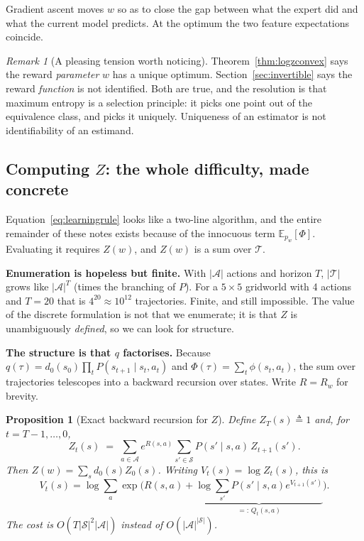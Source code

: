 \documentclass[11pt]{article}
\theoremstyle{plain}
\newtheorem{proposition}[theorem]{Proposition}
\theoremstyle{definition}
\theoremstyle{remark}
\newtheorem{remark}[theorem]{Remark}
\renewcommand{\S}{\mathcal{S}}
\newcommand{\A}{\mathcal{A}}
\newcommand{\T}{\mathcal{T}}
\newcommand{\E}{\mathbb{E}}
\begin{document}
Gradient ascent moves $w$ so as to close the gap between what the expert
did and what the current model predicts. At the optimum the two feature
expectations coincide.

\begin{remark}[A pleasing tension worth noticing]
Theorem~\ref{thm:logzconvex} says the reward \emph{parameter} $w$ has a
unique optimum. Section~\ref{sec:invertible} says the reward
\emph{function} is not identified. Both are true, and the resolution is
that maximum entropy is a selection principle: it picks one point out of
the equivalence class, and picks it uniquely. Uniqueness of an estimator
is not identifiability of an estimand.
\end{remark}

\subsection{Computing $Z$: the whole difficulty, made concrete}
\label{sec:computingz}

Equation~\eqref{eq:learningrule} looks like a two-line algorithm, and the
entire remainder of these notes exists because of the innocuous term
$\E_{p_w}[\Phi]$. Evaluating it requires $Z(w)$, and $Z(w)$ is a sum over
$\T$.

\textbf{Enumeration is hopeless but finite.} With $|\A|$ actions and
horizon $T$, $|\T|$ grows like $|\A|^T$ (times the branching of $P$). For
a $5\times5$ gridworld with 4 actions and $T=20$ that is $4^{20}\approx
10^{12}$ trajectories. Finite, and still impossible. The value of the
discrete formulation is not that we enumerate; it is that $Z$ is
unambiguously \emph{defined}, so we can look for structure.

\textbf{The structure is that $q$ factorises.} Because $q(\tau) =
d_0(s_0)\prod_t P(s_{t+1}\mid s_t,a_t)$ and $\Phi(\tau) =
\sum_t\phi(s_t,a_t)$, the sum over trajectories telescopes into a backward
recursion over states. Write $R=R_w$ for brevity.

\begin{proposition}[Exact backward recursion for $Z$]\label{prop:backwardz}
Define $Z_T(s) \triangleq 1$ and, for $t=T-1,\ldots,0$,
\begin{equation}
Z_t(s) \;=\; \sum_{a\in\A} e^{R(s,a)} \sum_{s'\in\S} P(s'\mid s,a)\,Z_{t+1}(s').
\label{eq:backwardz}
\end{equation}
Then $Z(w) = \sum_s d_0(s) Z_0(s)$. Writing $V_t(s) = \log Z_t(s)$, this is
\begin{equation}
V_t(s) = \log\sum_a \exp\Big(R(s,a) + \underbrace{\log\sum_{s'}P(s'\mid
s,a)e^{V_{t+1}(s')}}_{=:\,Q_t(s,a)}\Big).
\label{eq:backwardv}
\end{equation}
The cost is $O(T|\S|^2|\A|)$ instead of $O(|\A|^{|\S|})$.
\end{proposition}
\end{document}

